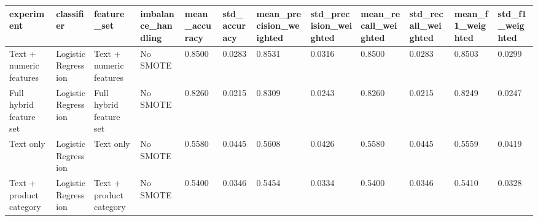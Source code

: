 \begin{tabular}{llllllllllll}
\toprule
experiment & classifier & feature\_set & imbalance\_handling & mean\_accuracy & std\_accuracy & mean\_precision\_weighted & std\_precision\_weighted & mean\_recall\_weighted & std\_recall\_weighted & mean\_f1\_weighted & std\_f1\_weighted \\
\midrule
Text + numeric features & Logistic Regression & Text + numeric features & No SMOTE & 0.8500 & 0.0283 & 0.8531 & 0.0316 & 0.8500 & 0.0283 & 0.8503 & 0.0299 \\
Full hybrid feature set & Logistic Regression & Full hybrid feature set & No SMOTE & 0.8260 & 0.0215 & 0.8309 & 0.0243 & 0.8260 & 0.0215 & 0.8249 & 0.0247 \\
Text only & Logistic Regression & Text only & No SMOTE & 0.5580 & 0.0445 & 0.5608 & 0.0426 & 0.5580 & 0.0445 & 0.5559 & 0.0419 \\
Text + product category & Logistic Regression & Text + product category & No SMOTE & 0.5400 & 0.0346 & 0.5454 & 0.0334 & 0.5400 & 0.0346 & 0.5410 & 0.0328 \\
\bottomrule
\end{tabular}
